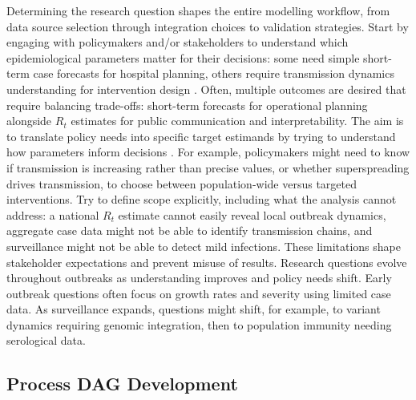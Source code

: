 \documentclass{article}
\begin{document}
Determining the research question shapes the entire modelling workflow, from data source selection through integration choices to validation strategies.
Start by engaging with policymakers and/or stakeholders to understand which epidemiological parameters matter for their decisions: some need simple short-term case forecasts for hospital planning, others require transmission dynamics understanding for intervention design \citep{marshall2024when}.
Often, multiple outcomes are desired that require balancing trade-offs: short-term forecasts for operational planning alongside $R_t$ estimates for public communication and interpretability.
The aim is to translate policy needs into specific target estimands by trying to understand how parameters inform decisions \citep{nicholson2022interoperability}.
For example, policymakers might need to know if transmission is increasing rather than precise values, or whether superspreading drives transmission, to choose between population-wide versus targeted interventions.
Try to define scope explicitly, including what the analysis cannot address: a national $R_t$ estimate cannot easily reveal local outbreak dynamics, aggregate case data might not be able to identify transmission chains, and surveillance might not be able to detect mild infections.
These limitations shape stakeholder expectations and prevent misuse of results.
Research questions evolve throughout outbreaks as understanding improves and policy needs shift.
Early outbreak questions often focus on growth rates and severity using limited case data.
As surveillance expands, questions might shift, for example, to variant dynamics requiring genomic integration, then to population immunity needing serological data.

\subsection{Process DAG Development}
\end{document}
